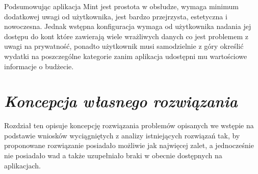 \documentclass[a4paper,10pt, twoside]{report}
\newcommand{\customstylechapter}[1]{\large{\textit{#1}}}
\newcommand{\customstylesection}[1]{\textbf{\textit{#1}}}
\begin{document}
\begin{large}
{Podsumowując aplikacja Mint jest prostota w obsłudze, wymaga minimum dodatkowej
 uwagi od użytkownika, jest bardzo przejrzysta, estetyczna i nowoczesna. Jednak 
wstępna konfiguracja wymaga od użytkownika nadania jej dostępu do kont które 
zawierają wiele wrażliwych danych co jest problemem z uwagi na prywatność, 
ponadto użytkownik musi samodzielnie z góry określić wydatki na poszczególne 
kategorie zanim aplikacja udostępni mu wartościowe informacje o budżecie.}


\chapter{\customstylechapter{Koncepcja własnego rozwiązania}}
{Rozdział ten opisuje koncepcję rozwiązania problemów opisanych we wstępie na 
podstawie wniosków wyciągniętych z analizy istniejących rozwiązań tak, by 
proponowane rozwiązanie posiadało możliwie jak najwięcej zalet, a jednocześnie 
nie posiadało wad a także uzupełniało braki w obecnie dostępnych na aplikacjach.}


\end{large}
\end{document}
